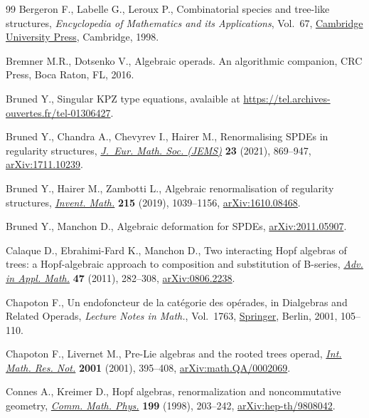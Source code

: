 \documentclass[pdftex]{sigma}
\numberwithin{equation}{section}
\begin{document}
\begin{thebibliography}{99}
\footnotesize\itemsep=0pt
Bergeron F., Labelle G., Leroux P., Combinatorial species and tree-like
 structures, \textit{Encyclopedia of Mathematics and its Applications},
 Vol.~67, \href{https://doi.org/10.1017/CBO9781107325913}{Cambridge University Press}, Cambridge, 1998.

Bremner M.R., Dotsenko V., Algebraic operads. An algorithmic companion, CRC
 Press, Boca Raton, FL, 2016.

Bruned Y., Singular {KPZ} type equations, avalaible at
 \url{https://tel.archives-ouvertes.fr/tel-01306427}.

Bruned Y., Chandra A., Chevyrev I., Hairer M., Renormalising {SPDE}s in
 regularity structures, \href{https://doi.org/10.4171/jems/1025}{\textit{J.~Eur. Math. Soc. (JEMS)}} \textbf{23} (2021),
 869--947, \href{https://arxiv.org/abs/1711.10239}{arXiv:1711.10239}.

Bruned Y., Hairer M., Zambotti L., Algebraic renormalisation of regularity
 structures, \href{https://doi.org/10.1007/s00222-018-0841-x}{\textit{Invent. Math.}} \textbf{215} (2019), 1039--1156,
 \href{https://arxiv.org/abs/1610.08468}{arXiv:1610.08468}.

Bruned Y., Manchon D., Algebraic deformation for {SPDE}s, \href{https://arxiv.org/abs/2011.05907}{arXiv:2011.05907}.

Calaque D., Ebrahimi-Fard K., Manchon D., Two interacting {H}opf algebras of
 trees: a {H}opf-algebraic approach to composition and substitution of
 {B}-series, \href{https://doi.org/10.1016/j.aam.2009.08.003}{\textit{Adv. in Appl. Math.}} \textbf{47} (2011), 282--308,
 \href{https://arxiv.org/abs/0806.2238}{arXiv:0806.2238}.

Chapoton F., Un endofoncteur de la cat\'egorie des op\'erades, in Dialgebras
 and Related Operads, \textit{Lecture Notes in Math.}, Vol.~1763, \href{https://doi.org/10.1007/3-540-45328-8_4}{Springer},
 Berlin, 2001, 105--110.

Chapoton F., Livernet M., Pre-{L}ie algebras and the rooted trees operad,
 \href{https://doi.org/10.1155/S1073792801000198}{\textit{Int. Math. Res. Not.}} \textbf{2001} (2001), 395--408,
 \href{https://arxiv.org/abs/math.QA/0002069}{arXiv:math.QA/0002069}.

Connes A., Kreimer D., Hopf algebras, renormalization and noncommutative
 geometry, \href{https://doi.org/10.1007/s002200050499}{\textit{Comm. Math. Phys.}} \textbf{199} (1998), 203--242,
 \href{https://arxiv.org/abs/hep-th/9808042}{arXiv:hep-th/9808042}.


\end{thebibliography}
\end{document}
